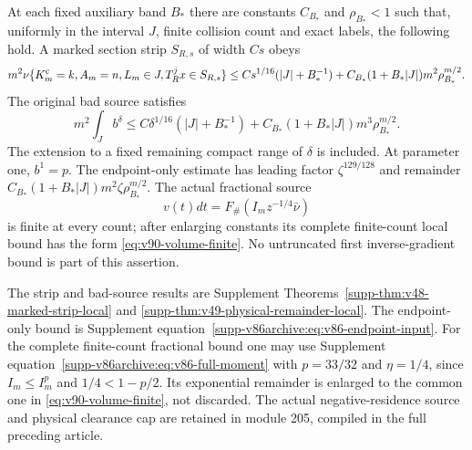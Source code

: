 \begin{inputstatement}
\label{input:v90-spectral}
At each fixed auxiliary band $B_*$ there are constants $C_{B_*}$
and $\rho_{B_*}<1$ such that, uniformly in the interval $J$,
finite collision count and exact labels, the following hold. A marked
section strip $S_{R,s}$ of width $Cs$ obeys
\begin{equation}\label{eq:v83-strip-input}
 m^2\nu\{K_m^{\rm c}=k,A_m=n,L_m\in J,T_R^jx\in S_{R,s}\}
 \le Cs^{1/16}(|J|+B_*^{-1})
       +C_{B_*}(1+B_*|J|)m^2\rho_{B_*}^{m/2}.
\end{equation}
The original bad source satisfies
\begin{equation}\label{eq:v90-bad-input}
 m^2\int_J b^\delta\le C\delta^{1/16}(|J|+B_*^{-1})
       +C_{B_*}(1+B_*|J|)m^3\rho_{B_*}^{m/2}.
\end{equation}
The extension to a fixed remaining compact range of $\delta$ is
included. At parameter one, $b^1=p$. The endpoint-only estimate has
leading factor $\zeta^{129/128}$ and remainder
$C_{B_*}(1+B_*|J|)m^2\zeta\rho_{B_*}^{m/2}$.
The actual fractional source
\[
 v(t)dt=F_\#(I_mz^{-1/4}\bar\nu)
\]
is finite at every count; after enlarging constants its complete
finite-count local bound has the form \eqref{eq:v90-volume-finite}.
No untruncated first inverse-gradient bound is part of this assertion.
\end{inputstatement}
The strip and bad-source results are Supplement
Theorems~\ref{supp-thm:v48-marked-strip-local} and
\ref{supp-thm:v49-physical-remainder-local}. The endpoint-only bound
is Supplement equation~\eqref{supp-v86archive:eq:v86-endpoint-input}.
For the complete finite-count fractional bound one may use Supplement
equation~\eqref{supp-v86archive:eq:v86-full-moment} with
$p=33/32$ and $\eta=1/4$, since $I_m\le I_m^p$ and
$1/4<1-p/2$. Its exponential remainder is enlarged to the common
one in \eqref{eq:v90-volume-finite}, not discarded. The actual
negative-residence source and physical clearance cap are retained in
module 205, compiled in the full preceding article.

